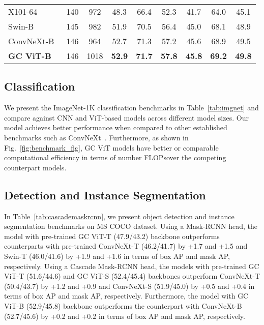 \documentclass{article}
\theoremstyle{plain}
\theoremstyle{definition}
\theoremstyle{remark}
\begin{document}
\begin{table*}[!t]
{\begin{tabular}{l|cc|cccccc}
        \midrule
        X101-64~\citep{xie2017aggregated} & 140 & 972 & 48.3 & 66.4 & 52.3 & 41.7 & 64.0 & 45.1 \\
        Swin-B~\citep{liu2021swin} & 145 & 982  & 51.9 & 70.5 & 56.4 & 45.0 & 68.1 & 48.9
        \\
        ConvNeXt-B~\citep{liu2022convnet} & 146 & 964 & 52.7 & 71.3 & 57.2 & 45.6 & 68.9 & 49.5 \\
        \rowcolor{Gray}
        \textbf{GC ViT-B} & 146 & 1018 & \textbf{52.9} & \textbf{71.7} & \textbf{57.8} & \textbf{45.8} & \textbf{69.2} & \textbf{49.8} \\
        \bottomrule
    \end{tabular}
    }
\end{table*}



\subsection{Classification}
\label{sec:exp_imagenet_results}

We present the ImageNet-1K classification benchmarks in Table~\ref{tab:imgnet} and compare against CNN and ViT-based models across different model sizes. Our model achieves better performance when compared to other established benchmarks such as ConvNeXt~\citep{liu2022convnet}. Furthermore, as shown in Fig.~\ref{fig:benchmark_fig}, GC ViT models have better or comparable computational efficiency in terms of number FLOPsover the competing counterpart models.


\subsection{Detection and Instance Segmentation}
\label{sec:exp_mscoco_results}
In Table~\ref{tab:cascademaskrcnn}, we present object detection and instance segmentation benchmarks on MS COCO dataset. Using a Mask-RCNN head, the model with pre-trained GC ViT-T (47.9/43.2) backbone outperforms counterparts with pre-trained ConvNeXt-T \citep{liu2022convnet} (46.2/41.7) by +1.7 and +1.5 and Swin-T \citep{liu2021swin} (46.0/41.6) by +1.9 and +1.6 in terms of box AP and mask AP, respectively. Using a Cascade Mask-RCNN head, the models with pre-trained GC ViT-T (51.6/44.6) and GC ViT-S (52.4/45.4) backbones outperform ConvNeXt-T \citep{liu2022convnet} (50.4/43.7) by +1.2 and +0.9 and ConvNeXt-S \citep{liu2022convnet} (51.9/45.0) by +0.5 and +0.4 in terms of box AP and mask AP, respectively. Furthermore, the model with GC ViT-B (52.9/45.8) backbone outperforms the counterpart with ConvNeXt-B \citep{liu2022convnet} (52.7/45.6) by +0.2 and +0.2 in terms of box AP and mask AP, respectively. 
\end{document}
